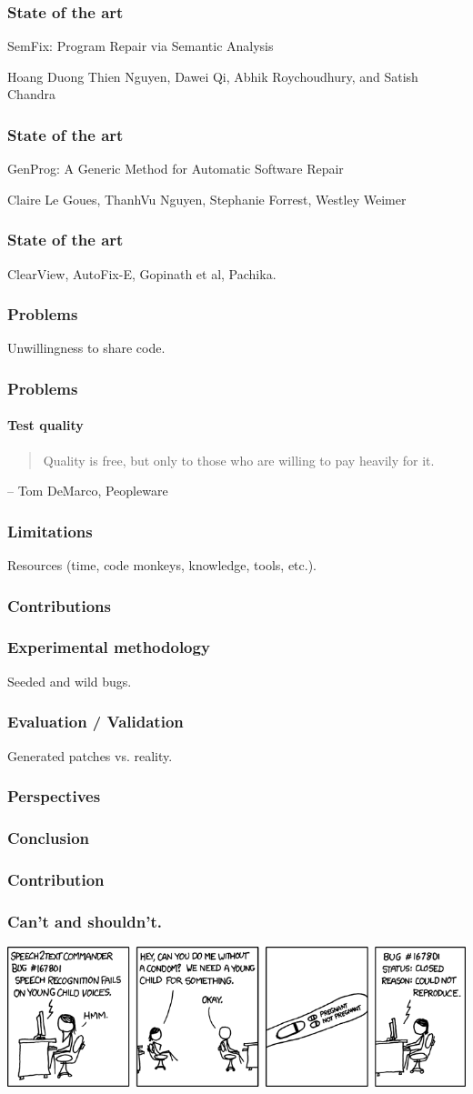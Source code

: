 \documentclass{beamer}
\begin{document}
  \frame
  {
    \frametitle{State of the art}
    SemFix: Program Repair via Semantic Analysis

Hoang Duong Thien Nguyen, Dawei Qi, Abhik Roychoudhury, and Satish Chandra
 }


  \frame
  {
    \frametitle{State of the art}
    GenProg: A Generic Method for Automatic Software Repair
    
Claire Le Goues, ThanhVu Nguyen, Stephanie Forrest, Westley Weimer
  }

  \frame
  {
    \frametitle{State of the art}
    ClearView, AutoFix-E, Gopinath et al, Pachika.
  }

  \frame
  {
    \frametitle{Problems}
    Unwillingness to share code.
  }

  \frame
  {
    \frametitle{Problems}
    \framesubtitle{Test quality}
   \begin{quote}
    Quality is free, but only to those who are willing to pay heavily for it.
   \end{quote}
   – Tom DeMarco, Peopleware
  }
 
  \frame
  {
    \frametitle{Limitations}
    Resources (time, code monkeys, knowledge, tools, etc.).
  }

  \frame
  {
    \frametitle{Contributions}
  }


  \frame
  {
    \frametitle{Experimental methodology}
    Seeded and wild bugs.
  }
  
  \frame
  {
    \frametitle{Evaluation / Validation}
    Generated patches vs. reality.
  }
  
  \frame
  {
    \frametitle{Perspectives}
    
  }
  
  \frame
  {
    \frametitle{Conclusion}
    
  }

  \frame
  {
    \frametitle{Contribution}
    
  }
  
 \frame
  {
    \frametitle{Can't and shouldn't.}
\includegraphics[width=.85\paperwidth]{cnr}

}
\end{document}

